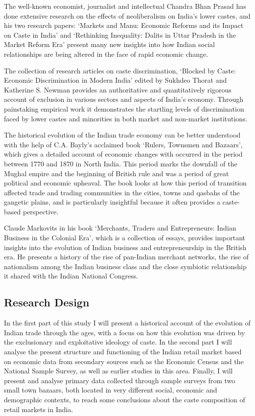 \documentclass[]{article}
\begin{document}
The well-known economist, journalist and intellectual Chandra Bhan
Prasad has done extensive research on the effects of neoliberalism on
India's lower castes, and his two research papers: `Markets and Manu:
Economic Reforms and its Impact on Caste in India' and `Rethinking
Inequality: Dalits in Uttar Pradesh in the Market Reform Era' present
many new insights into how Indian social relationships are being altered
in the face of rapid economic change.

The collection of research articles on caste discrimination, `Blocked by
Caste: Economic Discrimination in Modern India' edited by Sukhdeo Thorat
and Katherine S. Newman provides an authoritative and quantitatively
rigorous account of exclusion in various sectors and aspects of India's
economy. Through painstaking empirical work it demonstrates the
startling levels of discrimination faced by lower castes and minorities
in both market and non-market institutions.

The historical evolution of the Indian trade economy can be better
understood with the help of C.A. Bayly's acclaimed book `Rulers,
Townsmen and Bazaars', which gives a detailed account of economic
changes with occurred in the period between 1770 and 1870 in North
India. This period marks the downfall of the Mughal empire and the
beginning of British rule and was a period of great political and
economic upheaval. The book looks at how this period of transition
affected trade and trading communities in the cities, towns and qasbahs
of the gangetic plains, and is particularly insightful because it often
provides a caste-based perspective.

Claude Markovits in his book `Merchants, Traders and Entrepreneurs:
Indian Business in the Colonial Era', which is a collection of essays,
provides important insights into the evolution of Indian business and
entrepreneurship in the British era. He presents a history of the rise
of pan-Indian merchant networks, the rise of nationalism among the
Indian business class and the close symbiotic relationship it shared
with the Indian National Congress.

\subsection{Research Design}\label{research-design}

In the first part of this study I will present a historical account of
the evolution of Indian trade through the ages, with a focus on how this
evolution was driven by the exclusionary and exploitative ideology of
caste. In the second part I will analyse the present structure and
functioning of the Indian retail market based on economic data from
secondary sources such as the Economic Census and the National Sample
Survey, as well as earlier studies in this area. Finally, I will present
and analyse primary data collected through sample surveys from two small
town bazaars, both located in very different social, economic and
demographic contexts, to reach some conclusions about the caste
composition of retail markets in India.
\end{document}

